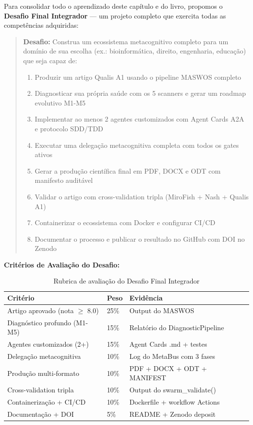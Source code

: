 Para consolidar todo o aprendizado deste capítulo e do livro, propomos o \textbf{Desafio Final Integrador} — um projeto completo que exercita todas as competências adquiridas:

\begin{quote}
\textbf{Desafio:} Construa um ecossistema metacognitivo completo para um domínio de sua escolha (ex.: bioinformática, direito, engenharia, educação) que seja capaz de:
\begin{enumerate}[leftmargin=*, label=(\arabic*)]
  \item Produzir um artigo Qualis A1 usando o pipeline MASWOS completo
  \item Diagnosticar sua própria saúde com os 5 scanners e gerar um roadmap evolutivo M1-M5
  \item Implementar ao menos 2 agentes customizados com Agent Cards A2A e protocolo SDD/TDD
  \item Executar uma delegação metacognitiva completa com todos os gates ativos
  \item Gerar a produção científica final em PDF, DOCX e ODT com manifesto auditável
  \item Validar o artigo com cross-validation tripla (MiroFish + Nash + Qualis A1)
  \item Containerizar o ecossistema com Docker e configurar CI/CD
  \item Documentar o processo e publicar o resultado no GitHub com DOI no Zenodo
\end{enumerate}
\end{quote}

\textbf{Critérios de Avaliação do Desafio:}

\begin{table}[H]
\centering
\caption{Rubrica de avaliação do Desafio Final Integrador}
\label{tab:desafio-rubric}
\begin{tabular}{@{}lll@{}}
\toprule
\textbf{Critério} & \textbf{Peso} & \textbf{Evidência} \\
\midrule
Artigo aprovado (nota $\ge$ 8.0) & 25\% & Output do MASWOS \\
Diagnóstico profundo (M1-M5) & 15\% & Relatório do DiagnosticPipeline \\
Agentes customizados (2+) & 15\% & Agent Cards .md + testes \\
Delegação metacognitiva & 10\% & Log do MetaBus com 3 fases \\
Produção multi-formato & 10\% & PDF + DOCX + ODT + MANIFEST \\
Cross-validation tripla & 10\% & Output do swarm\_validate() \\
Containerização + CI/CD & 10\% & Dockerfile + workflow Actions \\
Documentação + DOI & 5\% & README + Zenodo deposit \\
\bottomrule
\end{tabular}
\end{table}

